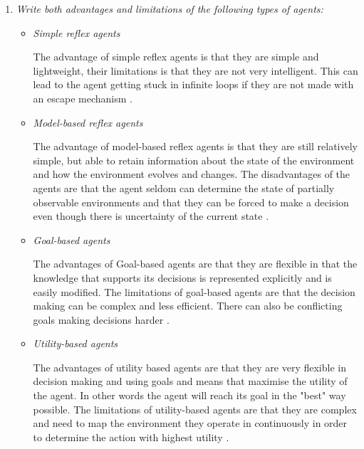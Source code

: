 \begin{enumerate}
    \item \textit{Write both advantages and limitations of the following types of agents:}
        \begin{itemize}
            \item \textit{Simple reflex agents}

            The advantage of simple reflex agents is that they are simple and lightweight, their limitations is that they are not very intelligent. This can lead to the agent getting stuck in infinite loops if they are not made with an escape mechanism \cite{aima}.
            
            \item \textit{Model-based reflex agents}

            The advantage of model-based reflex agents is that they are still relatively simple, but able to retain information about the state of the environment and how the environment evolves and changes. The disadvantages of the agents are that the agent seldom can determine the state of partially observable environments and that they can be forced to make a decision even though there is uncertainty of the current state \cite{aima}. 
            
            \item \textit{Goal-based agents}

            The advantages of Goal-based agents are that they are flexible in that the knowledge that supports its decisions is represented explicitly and is easily modified. The limitations of goal-based agents are that the decision making can be complex and less efficient. There can also be conflicting goals making decisions harder \cite{aima}.  
            
            \item \textit{Utility-based agents}

            The advantages of utility based agents are that they are very flexible in decision making and using goals and means that maximise the utility of the agent. In other words the agent will reach its goal in the "best" way possible. The limitations of utility-based agents are that they are complex and need to map the environment they operate in continuously in order to determine the action with highest utility \cite{aima}.  
            
        \end{itemize}
\end{enumerate}
